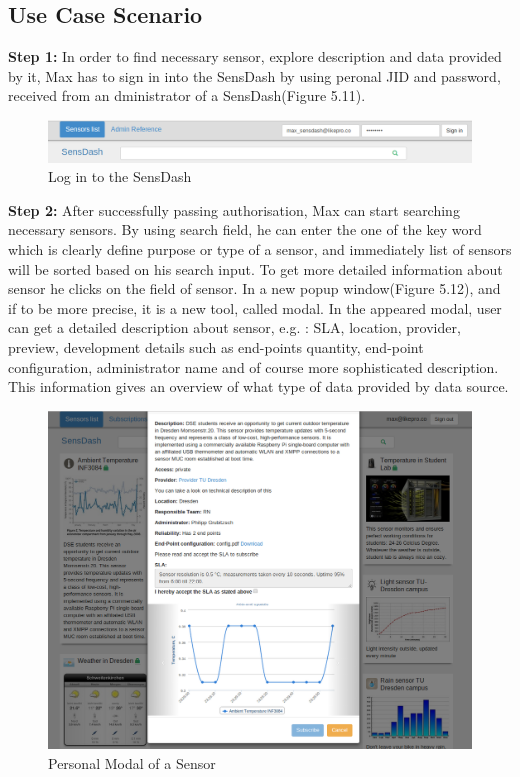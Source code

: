 \subsection{Use Case Scenario}

\textbf{Step 1:} In order to find necessary sensor, explore description and data provided by it, Max has to sign in into the SensDash by using peronal JID and password, received from an dministrator of a SensDash(Figure 5.11).
\begin{figure}[!ht]
\centering
\includegraphics[scale=0.6]{Screenshots/signIn.png}   
\caption[Log in to the SensDash]{Log in to the SensDash}                         
\end{figure}

\textbf{Step 2:} After successfully passing authorisation, Max can start searching necessary sensors. By using search field, he can enter the one of the key word which is clearly define purpose or type of a sensor, and immediately list of sensors will be sorted based on his search input. To get more detailed information about sensor he clicks on the field of sensor. In a new popup window(Figure 5.12), and if to be more precise, it is a new tool, called modal. In the appeared modal, user can get a detailed description about sensor, e.g. : SLA, location, provider, preview, development details such as end-points quantity, end-point configuration, administrator name and of course more sophisticated description. This information gives an overview of what type of data provided by data source. 
\begin{figure}[!ht]
\centering
\includegraphics[scale=0.6]{Screenshots/UseCaseWelcome.png}   
\caption[Personal Modal of a Sensor]{Personal Modal of a Sensor}                         
\end{figure}
 
